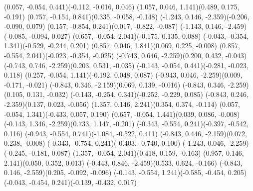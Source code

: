 \pstThreeDLine[linecolor=black](0.057, -0.054, 0.441)(-0.112, -0.016, 0.046)
\pstThreeDLine[linecolor=black](1.057, 0.046, 1.141)(0.489, 0.175, -0.191)
\pstThreeDLine[linecolor=black](0.757, -0.154, 0.841)(0.335, -0.058, -0.148)
\pstThreeDLine[linecolor=gray](-1.243, 0.146, -2.359)(-0.206, -0.090, 0.079)
\pstThreeDLine[linecolor=black](0.157, -0.854, 0.241)(0.017, -0.822, -0.087)
\pstThreeDLine[linecolor=gray](-1.143, 0.146, -2.459)(-0.085, -0.094, 0.027)
\pstThreeDLine[linecolor=black](0.657, -0.054, 2.041)(-0.175, 0.135, 0.088)
\pstThreeDLine[linecolor=black](-0.043, -0.354, 1.341)(-0.529, -0.244, 0.201)
\pstThreeDLine[linecolor=black](0.857, 0.046, 1.841)(0.069, 0.225, -0.008)
\pstThreeDLine[linecolor=black](0.857, -0.554, 2.041)(-0.023, -0.354, -0.025)
\pstThreeDLine[linecolor=gray](-0.743, 0.646, -2.259)(0.200, 0.432, -0.043)
\pstThreeDLine[linecolor=gray](-0.743, 0.746, -2.259)(0.203, 0.531, -0.035)
\pstThreeDLine[linecolor=black](-0.143, -0.054, 0.441)(-0.281, -0.023, 0.118)
\pstThreeDLine[linecolor=black](0.257, -0.054, 1.141)(-0.192, 0.048, 0.087)
\pstThreeDLine[linecolor=gray](-0.943, 0.046, -2.259)(0.009, -0.171, -0.021)
\pstThreeDLine[linecolor=gray](-0.843, 0.346, -2.159)(0.069, 0.139, -0.016)
\pstThreeDLine[linecolor=gray](-0.843, 0.346, -2.259)(0.105, 0.131, -0.032)
\pstThreeDLine[linecolor=black](-0.143, -0.254, 0.341)(-0.252, -0.229, 0.085)
\pstThreeDLine[linecolor=gray](-0.843, 0.246, -2.359)(0.137, 0.023, -0.056)
\pstThreeDLine[linecolor=black](1.357, 0.146, 2.241)(0.354, 0.374, -0.114)
\pstThreeDLine[linecolor=black](0.057, -0.054, 1.341)(-0.433, 0.057, 0.190)
\pstThreeDLine[linecolor=black](0.657, -0.054, 1.441)(0.039, 0.086, -0.008)
\pstThreeDLine[linecolor=gray](-0.143, 1.346, -2.259)(0.733, 1.147, -0.201)
\pstThreeDLine[linecolor=black](-0.343, -0.554, 0.241)(-0.397, -0.542, 0.116)
\pstThreeDLine[linecolor=black](-0.943, -0.554, 0.741)(-1.084, -0.522, 0.411)
\pstThreeDLine[linecolor=gray](-0.843, 0.446, -2.159)(0.072, 0.238, -0.008)
\pstThreeDLine[linecolor=black](-0.343, -0.754, 0.241)(-0.403, -0.740, 0.100)
\pstThreeDLine[linecolor=gray](-1.243, 0.046, -2.259)(-0.245, -0.181, 0.087)
\pstThreeDLine[linecolor=black](1.357, -0.054, 2.041)(0.418, 0.159, -0.163)
\pstThreeDLine[linecolor=black](0.957, 0.146, 2.141)(0.050, 0.352, 0.013)
\pstThreeDLine[linecolor=gray](-0.443, 0.846, -2.459)(0.533, 0.624, -0.166)
\pstThreeDLine[linecolor=gray](-0.843, 0.146, -2.559)(0.205, -0.092, -0.096)
\pstThreeDLine[linecolor=black](-0.143, -0.554, 1.241)(-0.585, -0.454, 0.205)
\pstThreeDLine[linecolor=black](-0.043, -0.454, 0.241)(-0.139, -0.432, 0.017)
